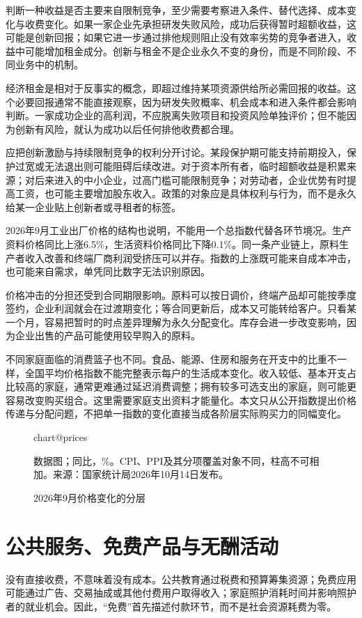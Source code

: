 \documentclass[UTF8,fontset=fandol,zihao=-4,oneside,openany]{ctexbook}
\makeatletter
\newcommand{\Chart}[3]{\begin{figure}[htbp]\centering\csname chart@#1\endcsname\caption{#2}\par\small #3\end{figure}}
\makeatother
\begin{document}
判断一种收益是否主要来自限制竞争，至少需要考察进入条件、替代选择、成本变化与收费变化。如果一家企业先承担研发失败风险，成功后获得暂时超额收益，这可能是创新回报；如果它进一步通过排他规则阻止没有效率劣势的竞争者进入，收益中可能增加租金成分。创新与租金不是企业永久不变的身份，而是不同阶段、不同业务中的机制。

\label{arg:P048}
经济租金是相对于反事实的概念，即超过维持某项资源供给所必需回报的收益。这个必要回报通常不能直接观察，因为研发失败概率、机会成本和进入条件都会影响判断。一家成功企业的高利润，不应脱离失败项目和投资风险单独评价；但不能因为创新有风险，就认为成功以后任何排他收费都合理。

应把创新激励与持续限制竞争的权利分开讨论。某段保护期可能支持前期投入，保护过宽或无法退出则可能阻碍后续改进。对于资本所有者，临时超额收益是积累来源；对后来进入的中小企业，过高门槛可能限制竞争；对劳动者，企业优势有时提高工资，也可能主要增加股东收入。政策的对象应是具体权利与行为，而不是永久给某一企业贴上创新者或寻租者的标签。

2026年9月工业出厂价格的结构也说明，不能用一个总指数代替各环节境况。生产资料价格同比上涨6.5\%，生活资料价格同比下降0.1\%。同一条产业链上，原料生产者收入改善和终端厂商利润受挤压可以并存。指数的上涨既可能来自成本冲击，也可能来自需求，单凭同比数字无法识别原因。\cite{PPI2026}

\label{arg:P049}
价格冲击的分担还受到合同期限影响。原料可以按日调价，终端产品却可能按季度签约，企业利润就会在过渡期变化；等合同更新后，成本又可能转给客户。只看某一个月，容易把暂时的时点差异理解为永久分配变化。库存会进一步改变影响，因为企业出售的产品可能使用较早购入的原料。

不同家庭面临的消费篮子也不同。食品、能源、住房和服务在开支中的比重不一样，全国平均价格指数不能完整表示每户的生活成本变化。收入较低、基本开支占比较高的家庭，通常更难通过延迟消费调整；拥有较多可选支出的家庭，则可能更容易改变购买组合。这里需要家庭支出资料才能量化。本文只从公开指数提出价格传递与分配问题，不把单一指数的变化直接当成各阶层实际购买力的同幅变化。

\Chart{prices}{2026年9月价格变化的分层}{数据图；同比，\%。CPI、PPI及其分项覆盖对象不同，柱高不可相加。来源：国家统计局2026年10月14日发布。\cite{CPI2026,PPI2026}}

\section{公共服务、免费产品与无酬活动}
没有直接收费，不意味着没有成本。公共教育通过税费和预算筹集资源；免费应用可能通过广告、交易抽成或其他付费用户取得收入；家庭照护消耗时间并影响照护者的就业机会。因此，“免费”首先描述付款环节，而不是社会资源耗费为零。
\end{document}
